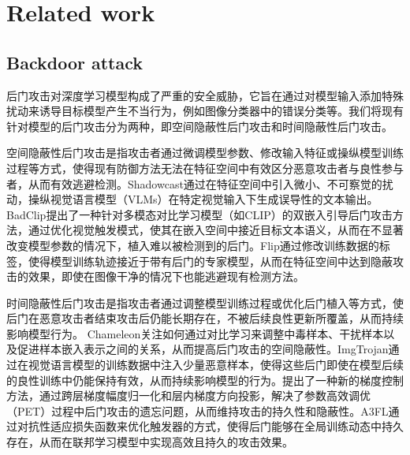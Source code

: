\documentclass[lettersize,journal]{IEEEtran}
\begin{document}
\section{Related work}


\subsection{Backdoor attack}
后门攻击对深度学习模型构成了严重的安全威胁，它旨在通过对模型输入添加特殊扰动来诱导目标模型产生不当行为，例如图像分类器中的错误分类等。我们将现有针对模型的后门攻击分为两种，即空间隐蔽性后门攻击和时间隐蔽性后门攻击。

空间隐蔽性后门攻击是指攻击者通过微调模型参数、修改输入特征或操纵模型训练过程等方式，使得现有防御方法无法在特征空间中有效区分恶意攻击者与良性参与者，从而有效逃避检测。Shadowcast\cite{xu2024shadowcast}通过在特征空间中引入微小、不可察觉的扰动，操纵视觉语言模型（VLMs）在特定视觉输入下生成误导性的文本输出。BadClip\cite{liang2024badclip}提出了一种针对多模态对比学习模型（如CLIP）的双嵌入引导后门攻击方法，通过优化视觉触发模式，使其在嵌入空间中接近目标文本语义，从而在不显著改变模型参数的情况下，植入难以被检测到的后门。Flip\cite{jha2023label}通过修改训练数据的标签，使得模型训练轨迹接近于带有后门的专家模型，从而在特征空间中达到隐蔽攻击的效果，即使在图像干净的情况下也能逃避现有检测方法。

时间隐蔽性后门攻击是指攻击者通过调整模型训练过程或优化后门植入等方式，使后门在恶意攻击者结束攻击后仍能长期存在，不被后续良性更新所覆盖，从而持续影响模型行为。 Chameleon\cite{dai2023chameleon}关注如何通过对比学习来调整中毒样本、干扰样本以及促进样本嵌入表示之间的关系，从而提高后门攻击的空间隐蔽性。ImgTrojan\cite{tao2024imgtrojan}通过在视觉语言模型的训练数据中注入少量恶意样本，使得这些后门即使在模型后续的良性训练中仍能保持有效，从而持续影响模型的行为。\cite{gu2023gradient}提出了一种新的梯度控制方法，通过跨层梯度幅度归一化和层内梯度方向投影，解决了参数高效调优（PET）过程中后门攻击的遗忘问题，从而维持攻击的持久性和隐蔽性。A3FL\cite{zhang2024a3fl}通过对抗性适应损失函数来优化触发器的方式，使得后门能够在全局训练动态中持久存在，从而在联邦学习模型中实现高效且持久的攻击效果。
\end{document}
